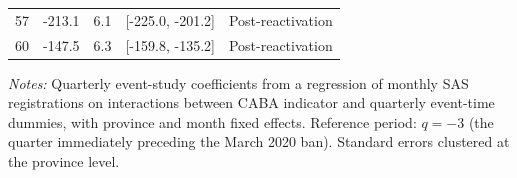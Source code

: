 \begin{table}[htbp]
\begin{tabular}{rrrrl}
57 & -213.1 & 6.1 & [-225.0, -201.2] & Post-reactivation \\
60 & -147.5 & 6.3 & [-159.8, -135.2] & Post-reactivation \\
\bottomrule
\end{tabular}
\par\vspace{0.3em}\begin{minipage}{\textwidth}\footnotesize
\textit{Notes:} Quarterly event-study coefficients from a regression of monthly SAS registrations on interactions between CABA indicator and quarterly event-time dummies, with province and month fixed effects. Reference period: $q = -3$ (the quarter immediately preceding the March 2020 ban). Standard errors clustered at the province level.
\end{minipage}
\end{table}
